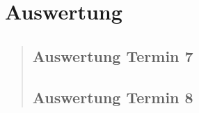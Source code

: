 \section{Auswertung}
\begin{quote}
	\subsection{Auswertung Termin 7}
    \begin{quote}

    \end{quote}  %

    \subsection{Auswertung Termin 8}
    \begin{quote}


    \end{quote}  %
\end{quote} %



